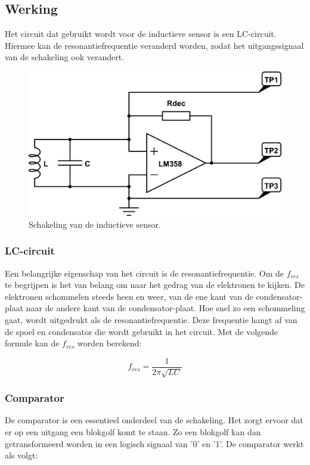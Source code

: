 \documentclass{report}
\begin{document}
\newpage
\subsection{Werking}

Het circuit dat gebruikt wordt voor de inductieve sensor is een LC-circuit. Hiermee kan de resonantiefrequentie veranderd worden, zodat het uitgangssignaal van de schakeling ook verandert.

\begin{figure}[H]
\centering
\includegraphics[scale=0.45]{inductieve_sensor.png}
\caption{Schakeling van de inductieve sensor.}
\label{fig:schakeling_sensor}
\end{figure}

\subsubsection{LC-circuit}
Een belangrijke eigenschap van het circuit is de resonantiefrequentie. Om de $f_{res}$ te begrijpen is het van belang om naar het gedrag van de elektronen te kijken. De elektronen schommelen steeds heen en weer, van de ene kant van de condensator-plaat naar de andere kant van de condensator-plaat. Hoe snel zo een schommeling gaat, wordt uitgedrukt als de resonantiefrequentie. Deze frequentie hangt af van de spoel en condensator die wordt gebruikt in het circuit. Met de volgende formule kan de $f_{res}$ worden berekend:

\begin{equation}
f_{res}=\frac{1}{2\pi\sqrt{LC}}
\end{equation}

\subsubsection{Comparator}
De comparator is een essentieel onderdeel van de schakeling. Het zorgt ervoor dat er op een uitgang een blokgolf komt te staan. Zo een blokgolf kan dan getransformeerd worden in een logisch signaal van '0' en '1'. De comparator werkt als volgt:
\end{document}
